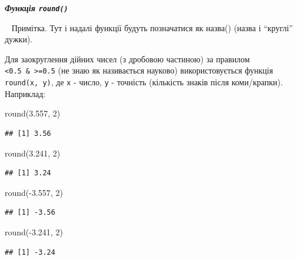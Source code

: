 \documentclass[
]{book}
\newenvironment{Shaded}{\begin{snugshade}}{\end{snugshade}}
\newcommand{\DecValTok}[1]{\textcolor[rgb]{0.00,0.00,0.81}{#1}}
\newcommand{\FloatTok}[1]{\textcolor[rgb]{0.00,0.00,0.81}{#1}}
\newcommand{\FunctionTok}[1]{\textcolor[rgb]{0.00,0.00,0.00}{#1}}
\newcommand{\NormalTok}[1]{#1}
\newcommand{\SpecialCharTok}[1]{\textcolor[rgb]{0.00,0.00,0.00}{#1}}
\begin{document}
\emph{\textbf{Функція \texttt{round()}}}

~ Примітка. Тут і надалі функції будуть позначатися як назва() (назва і ``круглі'' дужки).

Для заокруглення дійних чисел (з дробовою частиною) за правилом \texttt{\textless{}0.5\ \&\ \textgreater{}=0.5} (не знаю як називається науково) використовується функція \texttt{round(x,\ y)}, де \texttt{x} - число, \texttt{y} - точність (кількість знаків після коми/крапки). Наприклад:

\begin{Shaded}
\begin{Highlighting}[]
\FunctionTok{round}\NormalTok{(}\FloatTok{3.557}\NormalTok{, }\DecValTok{2}\NormalTok{)}
\end{Highlighting}
\end{Shaded}

\begin{verbatim}
## [1] 3.56
\end{verbatim}

\begin{Shaded}
\begin{Highlighting}[]
\FunctionTok{round}\NormalTok{(}\FloatTok{3.241}\NormalTok{, }\DecValTok{2}\NormalTok{)}
\end{Highlighting}
\end{Shaded}

\begin{verbatim}
## [1] 3.24
\end{verbatim}

\begin{Shaded}
\begin{Highlighting}[]
\FunctionTok{round}\NormalTok{(}\SpecialCharTok{{-}}\FloatTok{3.557}\NormalTok{, }\DecValTok{2}\NormalTok{)}
\end{Highlighting}
\end{Shaded}

\begin{verbatim}
## [1] -3.56
\end{verbatim}

\begin{Shaded}
\begin{Highlighting}[]
\FunctionTok{round}\NormalTok{(}\SpecialCharTok{{-}}\FloatTok{3.241}\NormalTok{, }\DecValTok{2}\NormalTok{)}
\end{Highlighting}
\end{Shaded}

\begin{verbatim}
## [1] -3.24
\end{verbatim}
\end{document}
